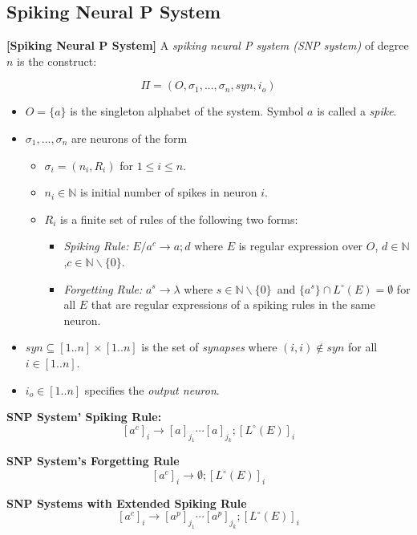 \documentclass[a4paper]{article}
\theoremstyle{definition}
\newcommand{\ra}{\rightarrow}
\begin{document}
\subsection{Spiking Neural P System}

\label{def-snp} \textbf{[Spiking Neural P System]} A \emph{spiking neural P system
(SNP system)} \cite{ionescu-2006-snp} of degree $n$ is the construct:

$$\Pi = (O, \sigma_1,...,\sigma_n,syn,i_o)$$

\begin{itemize}
\item $O = \{a\}$ is the singleton alphabet of the system. Symbol $a$ is called a \emph{spike}.
\item $\sigma_1,...,\sigma_n$ are neurons of the form
      \begin{itemize}
      \item $\sigma_i = (n_i, R_i)$ for $1 \leq i \leq n$. 
      \item $n_i \in \mathbb{N}$ is initial number of spikes in neuron $i$. 
      \item $R_i$ is a finite set of rules of the following two forms:
            \begin{itemize}
            \item \emph{Spiking Rule:} $E/a^c \ra a;d$ where $E$ is regular expression over $O$, 
                  $d \in \mathbb{N}$,$c \in \mathbb{N}\backslash \{0\}$.
            \item \emph{Forgetting Rule:} $a^s \ra \lambda$ where $s \in \mathbb{N}\backslash\{0\}$\
                  and $\{a^s\} \cap L^{\circ}(E) = \emptyset$ for all $E$ that are regular 
                  expressions of a spiking rules in the same neuron.
            \end{itemize}
      \end{itemize}
\item $syn \subseteq [1..n] \times [1..n]$ is the set of \emph {synapses} where $(i,i) \notin syn$ 
      for all $i \in [1..n]$.
\item $i_o \in [1..n]$ specifies the \emph{output neuron}.
\end{itemize}


\noindent \textbf{SNP System' Spiking Rule:}
$${[a^c]}_i \ra {[a]}_{j_1} \cdots [a]_{j_k};{[L^{\circ}(E)]}_i$$

\noindent \textbf{SNP System's Forgetting Rule}
$${[a^c]}_i \ra \emptyset;{[L^{\circ}(E)]}_i$$

\noindent \textbf{SNP Systems with  Extended Spiking Rule} \cite{chen-2008-snp-e}
$${[a^c]}_i \ra {[a^p]}_{j_1} \cdots {[a^p]}_{j_k};{[L^{\circ}(E)]}_i$$
\end{document}
